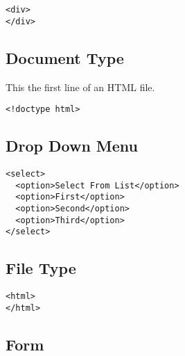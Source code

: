 \documentclass{article}
\begin{document}
\begin{lstlisting}
<div>
</div>
\end{lstlisting}

\subsection{Document Type}
This the first line of an HTML file.

\begin{lstlisting}
<!doctype html>
\end{lstlisting}

\subsection{Drop Down Menu}
\begin{lstlisting}
<select>
  <option>Select From List</option>
  <option>First</option>
  <option>Second</option>
  <option>Third</option>
</select>
\end{lstlisting}

\subsection{File Type}
\begin{lstlisting}
<html>
</html>
\end{lstlisting}

\subsection{Form}

\end{document}
